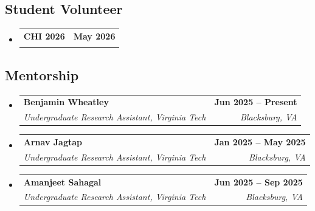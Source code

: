 \documentclass[letterpaper,11pt]{article}
\makeatletter
\newcommand{\resumeSubheading}[4]{
  \vspace{-2pt}\item
    \begin{tabular*}{1.0\textwidth}[t]{l@{\extracolsep{\fill}}r}
      \textbf{#1} & \textbf{\small #2} \\
      \textit{\small#3} & \textit{\small #4} \\
    \end{tabular*}\vspace{-7pt}
}
\newcommand{\resumeSubHeadingListStart}{\begin{itemize}[leftmargin=0.0in, label={}]}
\newcommand{\resumeSubHeadingListEnd}{\end{itemize}}
\makeatother
\begin{document}
\subsection*{Student Volunteer}
\resumeSubHeadingListStart
\resumeSubheading
  {CHI 2026}{May 2026}
  {}{}
\resumeSubHeadingListEnd

\subsection*{Mentorship}
\resumeSubHeadingListStart
\resumeSubheading
  {Benjamin Wheatley}{Jun 2025 -- Present}
  {Undergraduate Research Assistant, Virginia Tech}{Blacksburg, VA}

\resumeSubheading
  {Arnav Jagtap}{Jan 2025 -- May 2025}
  {Undergraduate Research Assistant, Virginia Tech}{Blacksburg, VA}

\resumeSubheading
  {Amanjeet Sahagal}{Jun 2025 -- Sep 2025}
  {Undergraduate Research Assistant, Virginia Tech}{Blacksburg, VA}
\resumeSubHeadingListEnd
\endgroup

\end{document}
